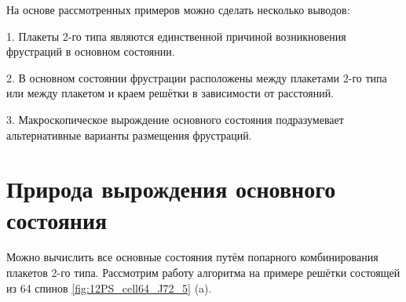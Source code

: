 \documentclass[utf8, babel, sor, jor, amsmath, amssymb, reprint]{elsarticle} %
\begin{document}
На основе рассмотренных примеров можно сделать несколько выводов:

1. Плакеты 2-го типа являются единственной причиной возникновения фрустраций в основном состоянии.

2. В основном состоянии фрустрации расположены между плакетами 2-го типа или между плакетом и краем решётки в зависимости от расстояний.

3. Макроскопическое вырождение основного состояния подразумевает альтернативные варианты размещения фрустраций.


\section{Природа вырождения основного состояния}

Можно вычислить все основные состояния путём попарного комбинирования плакетов 2-го типа.
Рассмотрим работу алгоритма на примере решётки состоящей из 64 спинов \ref{fig:12PS_cell64_J72_5} (a).
\end{document}
